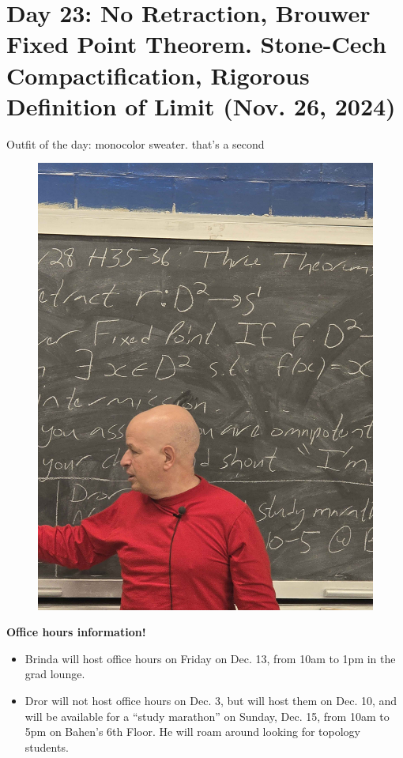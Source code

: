 \section{Day 23: No Retraction, Brouwer Fixed Point Theorem. Stone-Cech Compactification, Rigorous Definition of Limit (Nov. 26, 2024)}
Outfit of the day: monocolor sweater. that's a second
\begin{figure}[h]
    \centering
    \includegraphics[scale=0.1]{MAT327 Notes/Dror Shirts/dror day 24 shirt.jpg}
\end{figure}

\noindent \textbf{Office hours information!}
\begin{itemize}
    \item Brinda will host office hours on Friday on Dec. 13, from 10am to 1pm in the grad lounge.
    \item Dror will not host office hours on Dec. 3, but will host them on Dec. 10, and will be available for a ``study marathon'' on Sunday, Dec. 15, from 10am to 5pm on Bahen's 6th Floor. He will roam around looking for topology students.
\end{itemize}

